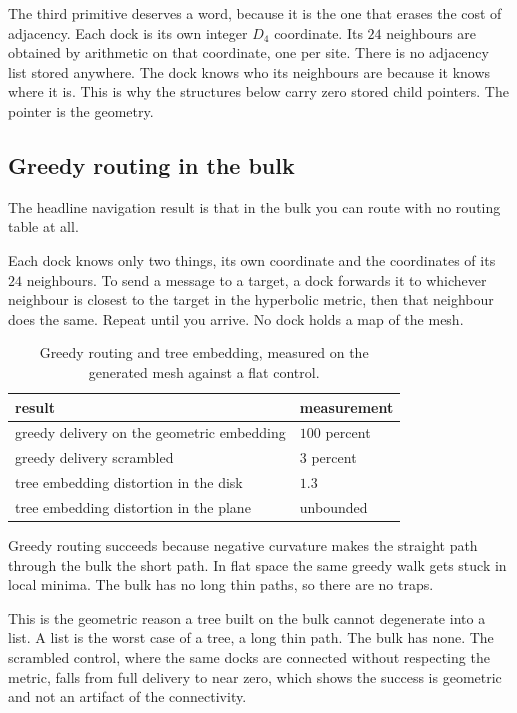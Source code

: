 The third primitive deserves a word, because it is the one that erases the cost of adjacency. Each dock is its own integer $D_4$ coordinate. Its $24$ neighbours are obtained by arithmetic on that coordinate, one per site. There is no adjacency list stored anywhere. The dock knows who its neighbours are because it knows where it is. This is why the structures below carry zero stored child pointers. The pointer is the geometry.

\subsection{Greedy routing in the bulk}

The headline navigation result is that in the bulk you can route with no routing table at all.

Each dock knows only two things, its own coordinate and the coordinates of its $24$ neighbours. To send a message to a target, a dock forwards it to whichever neighbour is closest to the target in the hyperbolic metric, then that neighbour does the same. Repeat until you arrive. No dock holds a map of the mesh.

\begin{table}[ht]
\centering
\begin{tabular}{@{}ll@{}}
\toprule
result & measurement \\
\midrule
greedy delivery on the geometric embedding & $100$ percent \\
greedy delivery scrambled & $3$ percent \\
tree embedding distortion in the disk & $1.3$ \\
tree embedding distortion in the plane & unbounded \\
\bottomrule
\end{tabular}
\caption{Greedy routing and tree embedding, measured on the generated mesh against a flat control.}
\label{tab:greedy}
\end{table}

\begin{result}
Greedy routing succeeds because negative curvature makes the straight path through the bulk the short path. In flat space the same greedy walk gets stuck in local minima. The bulk has no long thin paths, so there are no traps.
\end{result}

This is the geometric reason a tree built on the bulk cannot degenerate into a list. A list is the worst case of a tree, a long thin path. The bulk has none. The scrambled control, where the same docks are connected without respecting the metric, falls from full delivery to near zero, which shows the success is geometric and not an artifact of the connectivity.

